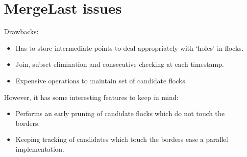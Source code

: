 


  
\section*{MergeLast issues}
	Drawbacks:
	\begin{itemize}
		\item Has to store intermediate points to deal appropriately with `holes' in flocks.
		\item Join, subset elimination and consecutive checking at each timestamp.
		\item Expensive operations to maintain set of candidate flocks.
	\end{itemize}
	However, it has some interesting features to keep in mind:
	\begin{itemize}
		\item Performs an early pruning of candidate flocks which do not touch the borders.
		\item Keeping tracking of candidates which touch the borders ease a parallel implementation. 
	\end{itemize}

